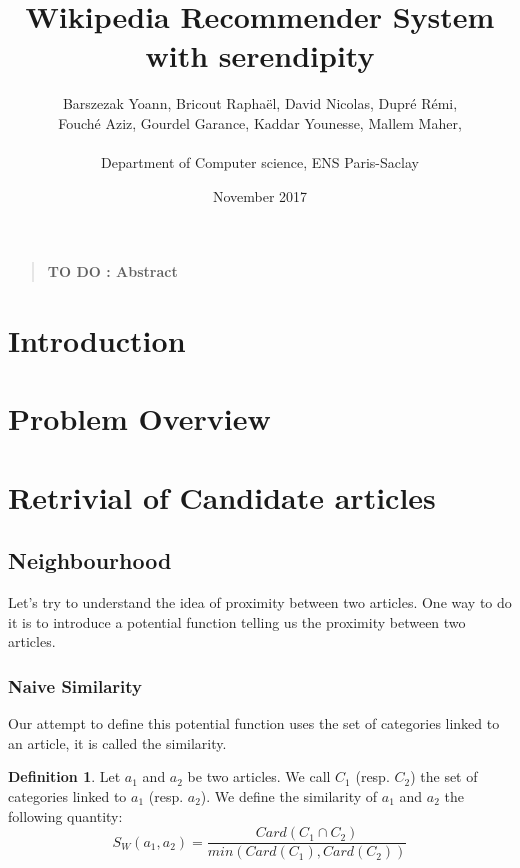 \documentclass[11pt]{article}
\title{Wikipedia Recommender System with serendipity}
\author
    {
      Barszezak Yoann, Bricout Rapha\"el, David Nicolas, Dupr\'e R\'emi,\\
      Fouch\'e Aziz, Gourdel Garance, Kaddar Younesse, Mallem Maher,\\
      \\
      \normalsize{Department of Computer science, ENS Paris-Saclay}\\
    }
\date{November 2017}
\theoremstyle{plain}
\theoremstyle{definition}
\newtheorem{defn}{Definition}[section]
\theoremstyle{remark}
\newenvironment{sciabstract}{
\begin{quote} \bf}
{\end{quote}}
\begin{document}
 


\baselineskip10pt


\maketitle 




\begin{sciabstract}
  TO DO : Abstract
\end{sciabstract}




\section{Introduction}


\section{Problem Overview}




\section{Retrivial of Candidate articles}

\subsection{Neighbourhood}

Let's try to understand the idea of proximity between two articles. One way to do it is to introduce a potential function telling us the proximity between two articles.

\subsubsection{Naive Similarity}

Our attempt to define this potential function uses the set of categories linked to an article, it is called the similarity.





\vspace*{5mm}
\begin{defn}
  Let $a_1$ and $a_2$ be two articles. We call $C_1$ (resp. $C_2$) the set of categories linked to $a_1$ (resp. $a_2$).
  We define the similarity of $a_1$ and $a_2$ the following quantity:\\
  \begin{equation*}
    S_W(a_1,a_2) = \frac{Card(C_1 \cap C_2)}{min(Card(C_1),Card(C_2))}
  \end{equation*}
\end{defn}
\end{document}
